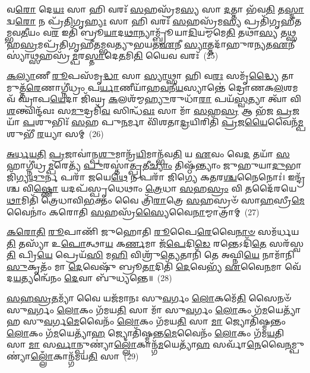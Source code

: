 𑌵\-\ul{𑌰𑍋} 𑌦𑍇\-\ul{𑌯𑌃} 𑌸𑌾 𑌹𑌿 𑌵𑌰𑌃᳴ \ul{𑌸}\-𑌹𑌸𑍍𑌰᳴𑌮\-\ul{𑌸𑍍𑌯} 𑌸𑌾 \ul{𑌦}\-𑌤𑍍𑌤𑌾 𑌭᳴𑌵\-\ul{𑌤𑌿} 𑌤\-\ul{𑌸𑍍𑌮𑌾}\-𑌦𑍍𑌵\-\ul{𑌰𑍋} 𑌨 𑌪𑍍𑌰᳴\-\ul{𑌤𑌿}\-𑌗𑍃\-\ul{𑌹𑍍𑌯𑌃} 𑌸𑌾 𑌹𑌿 𑌵𑌰𑌃᳴ \ul{𑌸}\-𑌹𑌸𑍍𑌰᳴𑌮\-\ul{𑌸𑍍𑌯} 𑌪𑍍𑌰𑌤𑌿᳴𑌗𑍃𑌹𑍀𑌤\-𑌮𑍍𑌭𑌵\-\ul{𑌤𑍀}\-𑌯𑌂 𑌵\-\ul{𑌰} 𑌇𑌤𑌿᳴ 𑌬𑍍𑌰𑍂\-\ul{𑌯𑌾}\-𑌦\-\ul{𑌥𑌾}\-𑌨𑍍𑌯𑌾𑌮𑍍𑌬𑍍𑌰𑍂᳴𑌯𑌾\-\ul{𑌦𑌿}\-𑌯𑌮𑍍𑌮𑌮𑍇\-\ul{𑌤𑌿} 𑌤𑌥𑌾॑\-\ul{𑌸𑍍𑌯} 𑌤\-\ul{𑌥𑍍𑌸}\-𑌹\-\ul{𑌸𑍍𑌰}\-𑌮𑌪𑍍𑌰᳴𑌤𑌿𑌗𑍃𑌹𑍀𑌤𑌮𑍍𑌭𑌵𑌤𑍍𑌯𑍁𑌭𑌯𑌤\-\ul{𑌏}\-𑌨𑍀 \ul{𑌸𑍍𑌯𑌾}\-𑌤𑍍𑌤𑌦𑌾᳴𑌹𑍁𑌰𑌨𑍍𑌯𑌤\-\-\ul{𑌏}\-𑌨𑍀 𑌸𑍍𑌯𑌾॑\-\ul{𑌥𑍍𑌸}\-𑌹𑌸𑍍𑌰᳴\-\ul{𑌮𑍍𑌪}\-𑌰\-\ul{𑌸𑍍𑌤𑌾}\-𑌦𑍇\-\ul{𑌤}\-𑌮𑌿\-\ul{𑌤𑌿} 𑌯𑍈𑌵 𑌵𑌰𑌃᳴~(25)

\-\ul{𑌕}\-\-\ul{𑌲𑍍𑌯𑌾}\-𑌣𑍀 \ul{𑌰𑍂}\-𑌪𑌸᳴𑌮𑍃\-\ul{𑌦𑍍𑌧𑌾} 𑌸𑌾 \ul{𑌸𑍍𑌯𑌾}\-𑌥𑍍𑌸𑌾 𑌹𑌿 𑌵\-\ul{𑌰𑌃} 𑌸𑌮𑍃᳴\-\ul{𑌦𑍍𑌧𑍍𑌯𑍈} 𑌤𑌾𑌮𑍁𑌤𑍍𑌤᳴\-\ul{𑌰𑍇}\-𑌣𑌾𑌗𑍍𑌨𑍀॑𑌧𑍍𑌰𑌂 𑌪\-\ul{𑌰𑍍𑌯𑌾}\-𑌣𑍀𑌯𑌾᳴𑌹\-\ul{𑌵}\-𑌨𑍀\-\ul{𑌯}\-𑌸𑍍𑌯𑌾𑌨𑍍𑌤𑍇॑ 𑌦𑍍𑌰𑍋𑌣𑌕\-\ul{𑌲}\-𑌶𑌮𑌵᳴ 𑌘𑍍𑌰𑌾𑌪\-\ul{𑌯𑍇}\-𑌦𑌾 𑌜𑌿᳴𑌘𑍍𑌰 \ul{𑌕}\-𑌲𑌶᳴𑌮𑍍𑌮\-\ul{𑌹𑍍𑌯𑍁}\-𑌰𑍁𑌧𑌾᳴\-\ul{𑌰𑌾} 𑌪𑌯᳴\-\ul{𑌸𑍍𑌵}\-𑌤𑍍𑌯𑌾 𑌤𑍍𑌵𑌾᳴ 𑌵𑌿\-\ul{𑌶}\-𑌨𑍍𑌤𑍍𑌵𑌿𑌨𑍍𑌦᳴𑌵𑌃 𑌸\-\ul{𑌮𑍁}\-𑌦𑍍𑌰𑌮𑌿᳴\-\ul{𑌵} 𑌸𑌿𑌨𑍍𑌧᳴\-\ul{𑌵𑌃} 𑌸𑌾 𑌮𑌾᳴ \ul{𑌸}\-𑌹\-\ul{𑌸𑍍𑌰} 𑌆 𑌭᳴𑌜 \ul{𑌪𑍍𑌰}\-𑌜𑌯𑌾᳴ \ul{𑌪}\-𑌶𑍁𑌭𑌿𑌃᳴ \ul{𑌸}\-𑌹 𑌪𑍁\-\ul{𑌨}\-𑌰𑍍𑌮𑌾 𑌵𑌿᳴𑌶𑌤𑌾\-\ul{𑌦𑍍𑌰}\-𑌯𑌿𑌰𑌿𑌤𑌿᳴ \ul{𑌪𑍍𑌰}\-𑌜\-\ul{𑌯𑍈}\-𑌵𑍈𑌨᳴\-\ul{𑌮𑍍𑌪}\-𑌶𑍁𑌭𑍀᳴ \ul{𑌰}\-𑌯𑍍𑌯𑌾 𑌸𑌮𑍍~(26)

\-\ul{𑌅}\-\-\ul{𑌰𑍍𑌧}\-\-\ul{𑌯}\-\-\ul{𑌤𑌿} \ul{𑌪𑍍𑌰}\-𑌜𑌾𑌵𑌾॑𑌨𑍍𑌪\-\ul{𑌶𑍁}\-𑌮𑌾𑌨𑍍𑌰᳴\-\ul{𑌯𑌿}\-𑌮𑌾𑌨𑍍𑌭᳴𑌵\-\ul{𑌤𑌿} 𑌯 \ul{𑌏}\-𑌵𑌂 𑌵𑍇\-\ul{𑌦} 𑌤𑌯𑌾᳴ \ul{𑌸}\-𑌹𑌾𑌗𑍍𑌨𑍀॑𑌧𑍍𑌰\-\ul{𑌮𑍍𑌪}\-𑌰𑍇𑌤𑍍𑌯᳴ \ul{𑌪𑍁}\-𑌰𑌸𑍍𑌤𑌾॑\-\ul{𑌤𑍍𑌪𑍍𑌰}\-𑌤𑍀\-\ul{𑌚𑍍𑌯𑌾𑌂} 𑌤𑌿𑌷𑍍𑌠᳴𑌨𑍍𑌤𑍍𑌯𑌾𑌂 𑌜𑍁𑌹𑍁𑌯𑌾\-\ul{𑌦𑍁}\-𑌭𑌾 𑌜𑌿᳴𑌗𑍍𑌯\-\ul{𑌥𑍁}\-𑌰𑍍𑌨 𑌪𑌰𑌾᳴ 𑌜𑌯𑍇\-\ul{𑌥𑍇} 𑌨 𑌪𑌰𑌾᳴ 𑌜𑌿𑌗𑍍𑌯𑍇 𑌕\-\ul{𑌤}\-𑌰\-\ul{𑌶𑍍𑌚}\-𑌨𑍈𑌨𑍋𑌃॑। 𑌇𑌨𑍍𑌦𑍍𑌰᳴𑌶𑍍𑌚 𑌵𑌿\-\ul{𑌷𑍍𑌣𑍋} 𑌯𑌦𑌪᳴𑌸𑍍𑌪𑍃𑌧𑍇𑌥𑌾𑌂 \ul{𑌤𑍍𑌰𑍇}\-𑌧𑌾 \ul{𑌸}\-𑌹\-\ul{𑌸𑍍𑌰𑌂} 𑌵𑌿 𑌤𑌦𑍈᳴𑌰𑌯𑍇\-\ul{𑌥𑌾}\-𑌮𑌿𑌤𑌿᳴ 𑌤𑍍𑌰𑍇𑌧𑌾𑌵𑌿\-\ul{𑌭}\-𑌕𑍍𑌤𑌂 𑌵𑍈 𑌤𑍍𑌰𑌿᳴\-\ul{𑌰𑌾}\-𑌤𑍍𑌰𑍇 \ul{𑌸}\-𑌹𑌸𑍍𑌰𑍞᳴ 𑌸𑌾\-\ul{𑌹}\-𑌸𑍍𑌰𑍀\-\ul{𑌮𑍇}\-𑌵𑍈𑌨𑌾𑌂॑ 𑌕𑌰𑍋𑌤𑌿 \ul{𑌸}\-𑌹𑌸𑍍𑌰᳴\-\ul{𑌸𑍍𑌯𑍈}\-𑌵𑍈\-\ul{𑌨𑌾}\-𑌮𑍍𑌮𑌾𑌤𑍍𑌰𑌾॑𑌮𑍍~(27)

\-\ul{𑌕}\-\-\ul{𑌰𑍋}\-\-\ul{𑌤𑌿} \ul{𑌰𑍂}\-𑌪𑌾𑌣𑌿᳴ 𑌜𑍁𑌹𑍋𑌤𑌿 \ul{𑌰𑍂}\-𑌪𑍈\-\ul{𑌰𑍇}\-𑌵𑍈\-\ul{𑌨𑌾}\-\-\ul{𑍞} 𑌸𑌮᳴𑌰𑍍𑌧𑌯\-\ul{𑌤𑌿} 𑌤𑌸𑍍𑌯𑌾᳴ 𑌉\-\ul{𑌪𑍋}\-𑌤𑍍𑌥𑌾\-\ul{𑌯} 𑌕\-\ul{𑌰𑍍𑌣}\-𑌮𑌾 𑌜᳴\-\ul{𑌪𑍇}\-𑌦𑌿\-\ul{𑌡𑍇} 𑌰𑌨𑍍𑌤𑍇\-𑌽𑌦𑌿᳴\-\ul{𑌤𑍇} 𑌸𑌰᳴𑌸𑍍𑌵\-\ul{𑌤𑌿} 𑌪𑍍𑌰𑌿\-\ul{𑌯𑍇} 𑌪𑍍𑌰𑍇𑌯᳴\-\ul{𑌸𑌿} 𑌮\-\ul{𑌹𑌿} 𑌵𑌿𑌶𑍍𑌰𑍁᳴\-\ul{𑌤𑍍𑌯𑍇}\-𑌤𑌾𑌨𑌿᳴ 𑌤𑍇 𑌅𑌘𑍍𑌨𑌿\-\ul{𑌯𑍇} 𑌨𑌾𑌮𑌾᳴𑌨𑌿 \ul{𑌸𑍁}\-𑌕𑍃𑌤𑌂᳴ 𑌮𑌾 \ul{𑌦𑍇}\-𑌵𑍇𑌷𑍁᳴ 𑌬𑍍𑌰𑍂\-\ul{𑌤𑌾}\-𑌦𑌿𑌤𑌿᳴ \ul{𑌦𑍇}\-𑌵𑍇𑌭𑍍𑌯᳴ \ul{𑌏}\-𑌵𑍈\-\ul{𑌨}\-𑌮𑌾 𑌵𑍇᳴𑌦\-\ul{𑌯}\-𑌤𑍍𑌯𑌨𑍍𑌵𑍇᳴𑌨𑌂 \ul{𑌦𑍇}\-𑌵𑌾 𑌬𑍁᳴𑌧𑍍𑌯𑌨𑍍𑌤𑍇॥~(28)

{\anuvakamend[{\-\ul{𑌏}\-𑌤\-\ul{𑌦𑍇}\-𑌤𑌸𑍍𑌯𑌾𑌂॑ \ul{𑌵𑍀}\-𑌰𑍍𑌯᳴𑌮𑌸𑍍𑌯 \ul{𑌤𑍍𑌰𑌿}\-𑌭𑌿𑌶𑍍𑌚᳴ \ul{𑌦}\-𑌤𑍍𑌤𑌾 𑌸᳴𑌹𑌸𑍍𑌰\-\ul{𑌤}\-𑌮𑍀 𑌤𑌸𑍍𑌮𑌾᳴\-\ul{𑌦𑍇}\-𑌵 𑌵\-\ul{𑌰𑌃} 𑌸𑌮𑍍𑌮𑌾\-\ul{𑌤𑍍𑌰𑌾}\-𑌮𑍇\-\ul{𑌕𑌾}\-𑌨𑍍𑌨𑌚᳴𑌤𑍍𑌵𑌾\-\ul{𑌰𑌿}\-\-\ul{𑍞}\-𑌶𑌚𑍍𑌚᳴}]}%

\-\ul{𑌸}\-\-\ul{𑌹}\-\-\ul{𑌸𑍍𑌰}\-\-\ul{𑌤}\-𑌮𑍍𑌯𑌾᳴ 𑌵𑍈 𑌯𑌜᳴𑌮𑌾𑌨𑌃 𑌸𑍁\-\ul{𑌵}\-𑌰𑍍𑌗𑌂 \ul{𑌲𑍋}\-𑌕𑌮𑍇᳴\-\ul{𑌤𑌿} 𑌸𑍈𑌨𑍞᳴ 𑌸𑍁\-\ul{𑌵}\-𑌰𑍍𑌗𑌂 \ul{𑌲𑍋}\-𑌕𑌂 𑌗᳴𑌮𑌯\-\ul{𑌤𑌿} 𑌸𑌾 𑌮𑌾᳴ 𑌸𑍁\-\ul{𑌵}\-𑌰𑍍𑌗𑌂 \ul{𑌲𑍋}\-𑌕𑌂 𑌗᳴\-\ul{𑌮}\-𑌯𑍇𑌤𑍍𑌯𑌾᳴𑌹 𑌸𑍁\-\ul{𑌵}\-𑌰𑍍𑌗\-\ul{𑌮𑍇}\-𑌵𑍈𑌨𑌂᳴ \ul{𑌲𑍋}\-𑌕𑌂 𑌗᳴𑌮𑌯\-\ul{𑌤𑌿} 𑌸𑌾 \ul{𑌮𑌾} 𑌜𑍍𑌯𑍋𑌤𑌿᳴𑌷𑍍𑌮𑌨𑍍𑌤𑌂 \ul{𑌲𑍋}\-𑌕𑌂 𑌗᳴\-\ul{𑌮}\-𑌯𑍇𑌤𑍍𑌯𑌾᳴\-\ul{𑌹} 𑌜𑍍𑌯𑍋𑌤𑌿᳴𑌷𑍍𑌮𑌨𑍍𑌤\-\ul{𑌮𑍇}\-𑌵𑍈𑌨𑌂᳴ \ul{𑌲𑍋}\-𑌕𑌂 𑌗᳴𑌮\-\ul{𑌯}\-𑌤𑌿 𑌸𑌾 \ul{𑌮𑌾} 𑌸\-\ul{𑌰𑍍𑌵𑌾}\-𑌨𑍍𑌪𑍁𑌣𑍍𑌯𑌾॑\-\-\ul{𑌲𑍍𑌲𑍋𑌁}\-𑌕𑌾𑌨𑍍𑌗᳴\-\ul{𑌮}\-𑌯𑍇𑌤𑍍𑌯𑌾᳴\-\ul{𑌹} 𑌸𑌰𑍍𑌵𑌾᳴\-\ul{𑌨𑍇}\-𑌵𑍈\-\ul{𑌨}\-𑌮𑍍𑌪𑍁𑌣𑍍𑌯𑌾॑\-\ul{𑌲𑍍𑌲𑍋𑌁}\-𑌕𑌾𑌨𑍍𑌗᳴𑌮𑌯\-\ul{𑌤𑌿} 𑌸𑌾~(29)

